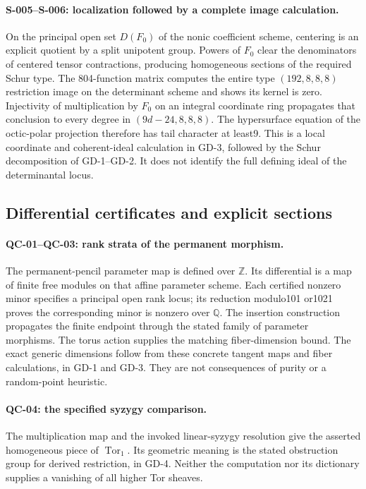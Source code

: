 \paragraph{S-005--S-006: localization followed by a complete image calculation.}
On the principal open set $D(F_0)$ of the nonic coefficient scheme,
centering is an explicit quotient by a split unipotent group.
Powers of $F_0$ clear the denominators of centered tensor contractions,
producing homogeneous sections of the required Schur type.
The 804-function matrix computes the entire type $(192,8,8,8)$
restriction image on the determinant scheme and shows its kernel is
zero. Injectivity of multiplication by $F_0$ on an integral coordinate
ring propagates that conclusion to every degree in
$(9d-24,8,8,8)$. The hypersurface equation of the octic-polar projection
therefore has tail character at least9. This is a local coordinate and
coherent-ideal calculation in GD-3, followed by the Schur decomposition
of GD-1--GD-2. It does not identify the full defining ideal of the
determinantal locus.

\subsection{Differential certificates and explicit sections}

\paragraph{QC-01--QC-03: rank strata of the permanent morphism.}
The permanent-pencil parameter map is defined over $\mathbb Z$.
Its differential is a map of finite free modules on that affine
parameter scheme. Each certified nonzero minor specifies a principal
open rank locus; its reduction modulo101 or1021 proves the corresponding
minor is nonzero over $\mathbb Q$. The insertion construction propagates
the finite endpoint through the stated family of parameter morphisms.
The torus action supplies the matching fiber-dimension bound.
The exact generic dimensions follow from these concrete tangent maps
and fiber calculations, in GD-1 and GD-3. They are not consequences of
purity or a random-point heuristic.

\paragraph{QC-04: the specified syzygy comparison.}
The multiplication map and the invoked linear-syzygy resolution give
the asserted homogeneous piece of $\operatorname{Tor}_1$. Its geometric
meaning is the stated obstruction group for derived restriction, in
GD-4. Neither the computation nor its dictionary supplies a vanishing
of all higher Tor sheaves.

